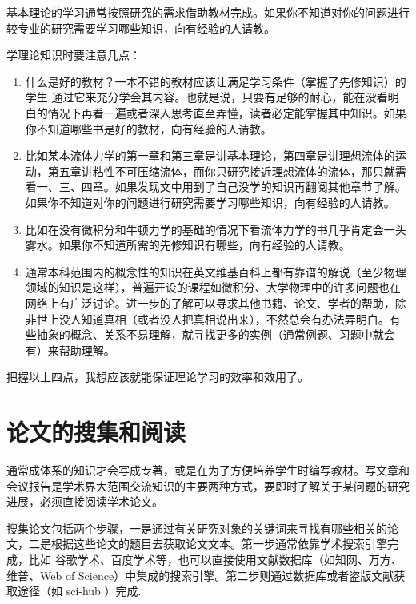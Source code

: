 \documentclass[a4paper,10pt,english]{sphinxmanual}
\begin{document}
基本理论的学习通常按照研究的需求借助教材完成。如果你不知道对你的问题进行较专业的研究需要学习哪些知识，向有经验的人请教。

学理论知识时要注意几点：
\begin{enumerate}
\item {} 
 什么是好的教材？一本不错的教材应该让满足学习条件（掌握了先修知识）的学生  通过它来充分学会其内容。也就是说，只要有足够的耐心，能在没看明白的情况下再看一遍或者深入思考直至弄懂，读者必定能掌握其中知识。如果你不知道哪些书是好的教材，向有经验的人请教。

\item {} 
 比如某本流体力学的第一章和第三章是讲基本理论，第四章是讲理想流体的运动，第五章讲粘性不可压缩流体，而你只研究接近理想流体的流体，那只就需看一、三、四章。如果发现文中用到了自己没学的知识再翻阅其他章节了解。如果你不知道对你的问题进行研究需要学习哪些知识，向有经验的人请教。

\item {} 
 比如在没有微积分和牛顿力学的基础的情况下看流体力学的书几乎肯定会一头雾水。如果你不知道所需的先修知识有哪些，向有经验的人请教。

\item {} 
 通常本科范围内的概念性的知识在英文维基百科上都有靠谱的解说（至少物理领域的知识是这样），普遍开设的课程如微积分、大学物理中的许多问题也在网络上有广泛讨论。进一步的了解可以寻求其他书籍、论文、学者的帮助，除非世上没人知道真相（或者没人把真相说出来），不然总会有办法弄明白。有些抽象的概念、关系不易理解，就寻找更多的实例（通常例题、习题中就会有）来帮助理解。

\end{enumerate}

把握以上四点，我想应该就能保证理论学习的效率和效用了。


\section{论文的搜集和阅读}
\label{\detokenize{4. GetInfo:id3}}
通常成体系的知识才会写成专著，或是在为了方便培养学生时编写教材。写文章和会议报告是学术界大范围交流知识的主要两种方式，要即时了解关于某问题的研究进展，必须直接阅读学术论文。

搜集论文包括两个步骤，一是通过有关研究对象的关键词来寻找有哪些相关的论文，二是根据这些论文的题目去获取论文文本。第一步通常依靠学术搜索引擎完成，比如 谷歌学术、百度学术等，也可以直接使用文献数据库（如知网、万方、维普、Web of Science）中集成的搜索引擎。第二步则通过数据库或者盗版文献获取途径（如 sci-hub ）完成.
\end{document}

